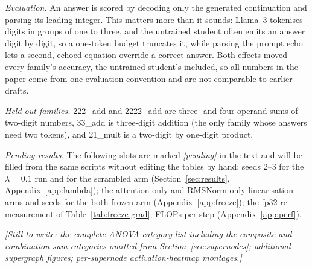 \documentclass{article}
\newcommand{\todosec}[1]{{\color{Gray}\emph{[#1]}}}
\newcommand{\pending}[1]{{\color{BurntOrange}\emph{[pending#1]}}}
\begin{document}
\emph{Evaluation.} An answer is scored by decoding only the generated continuation and parsing its
leading integer. This matters more than it sounds: Llama~3 tokenises digits in groups of one to
three, and the untrained student often emits an answer digit by digit, so a one-token budget
truncates it, while parsing the prompt echo lets a second, echoed equation override a correct
answer. Both effects moved every family's accuracy, the untrained student's included, so all
numbers in the paper come from one evaluation convention and are not comparable to earlier drafts.

\emph{Held-out families.} 222\_add and 2222\_add are three- and four-operand sums of two-digit
numbers, 33\_add is three-digit addition (the only family whose answers need two tokens), and
21\_mult is a two-digit by one-digit product.

\emph{Pending results.} The following slots are marked \pending{} in the text and will be filled
from the same scripts without editing the tables by hand: seeds 2--3 for the $\lambda = 0.1$ run
and for the scrambled arm (Section~\ref{sec:results}, Appendix~\ref{app:lambda}); the
attention-only and RMSNorm-only linearisation arms and seeds for the both-frozen arm
(Appendix~\ref{app:freeze}); the fp32 re-measurement of Table~\ref{tab:freeze-grad}; FLOPs per
step (Appendix~\ref{app:perf}).

\todosec{Still to write: the complete ANOVA category list including the composite and
combination-sum categories omitted from Section~\ref{sec:supernodes}; additional supergraph
figures; per-supernode activation-heatmap montages.}
\end{document}
